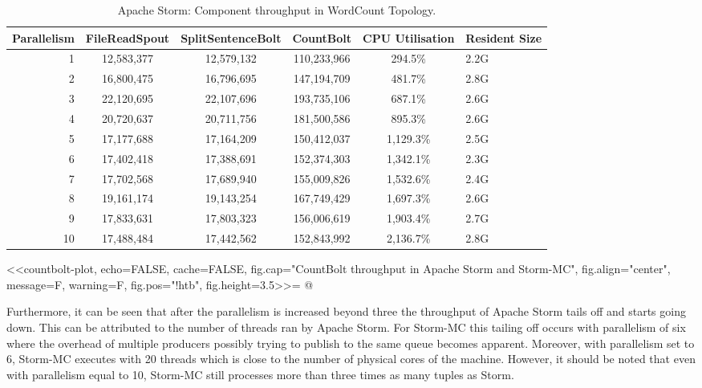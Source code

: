 \begin{table}[!htb]
\begin{adjustwidth}{-0.5in}{-0.5in}
\centering
\small
\begin{tabular}{@{}rccccl@{}}
    \textbf{Parallelism} & \textbf{FileReadSpout} & \textbf{SplitSentenceBolt} & \textbf{CountBolt} & \textbf{CPU Utilisation} & \textbf{Resident Size} \\ \toprule
    1 & {12,583,377} & {12,579,132} & {110,233,966} & {294.5\%} & {2.2G} \\
    2 & {16,800,475} & {16,796,695} & {147,194,709} & {481.7\%} & {2.8G} \\
    3 & {22,120,695} & {22,107,696} & {193,735,106} & {687.1\%} & {2.6G} \\
    4 & {20,720,637} & {20,711,756} & {181,500,586} & {895.3\%} & {2.6G} \\
	5 & {17,177,688} & {17,164,209} & {150,412,037} & {1,129.3\%} & {2.5G} \\
	6 & {17,402,418} & {17,388,691} & {152,374,303} & {1,342.1\%} & {2.3G} \\
	7 & {17,702,568} & {17,689,940} & {155,009,826} & {1,532.6\%} & {2.4G} \\
	8 & {19,161,174} & {19,143,254} & {167,749,429} & {1,697.3\%} & {2.6G} \\
	9 & {17,833,631} & {17,803,323} & {156,006,619} & {1,903.4\%} & {2.7G} \\
	10 & {17,488,484} & {17,442,562} & {152,843,992} & {2,136.7\%} & {2.8G} \\
\end{tabular}
\caption{Apache Storm: Component throughput in WordCount Topology.}
\label{table:storm_wordcount}
\end{adjustwidth}
\end{table}

<<countbolt-plot, echo=FALSE, cache=FALSE, fig.cap="CountBolt throughput in Apache Storm and Storm-MC", fig.align="center", message=F, warning=F, fig.pos="!htb", fig.height=3.5>>=
@

Furthermore, it can be seen that after the parallelism is increased beyond three the throughput of Apache Storm tails off and starts going down. This can be attributed to the number of threads ran by Apache Storm. For Storm-MC this tailing off occurs with parallelism of six where the overhead of multiple producers possibly trying to publish to the same queue becomes apparent. Moreover, with parallelism set to 6, Storm-MC executes with 20 threads which is close to the number of physical cores of the machine. However, it should be noted that even with parallelism equal to 10, Storm-MC still processes more than three times as many tuples as Storm.

